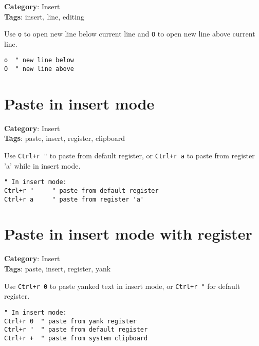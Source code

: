 {{{{{{\textbf{Category}: Insert\\ \textbf{Tags}: insert, line, editing
\vspace{0.5cm}

Use {\footnotesize \Verb§o§} to open new line below current line and {\footnotesize \Verb§O§} to open new line above current line.

\begin{Exa*}{}
\begin{Verbatim}[fontsize=\footnotesize, breaklines, breakanywhere]
o  " new line below
O  " new line above
\end{Verbatim}
\end{Exa*}

\section{Paste in insert mode}

\textbf{Category}: Insert\\ \textbf{Tags}: paste, insert, register, clipboard
\vspace{0.5cm}

Use {\footnotesize \Verb§Ctrl+r "§} to paste from default register, or {\footnotesize \Verb§Ctrl+r a§} to paste from register 'a' while in insert mode.

\begin{Exa*}{}
\begin{Verbatim}[fontsize=\footnotesize, breaklines, breakanywhere]
" In insert mode:
Ctrl+r "     " paste from default register
Ctrl+r a     " paste from register 'a'
\end{Verbatim}
\end{Exa*}

\section{Paste in insert mode with register}

\textbf{Category}: Insert\\ \textbf{Tags}: paste, insert, register, yank
\vspace{0.5cm}

Use {\footnotesize \Verb§Ctrl+r 0§} to paste yanked text in insert mode, or {\footnotesize \Verb§Ctrl+r "§} for default register.

\begin{Exa*}{}
\begin{Verbatim}[fontsize=\footnotesize, breaklines, breakanywhere]
" In insert mode:
Ctrl+r 0  " paste from yank register
Ctrl+r "  " paste from default register
Ctrl+r +  " paste from system clipboard
\end{Verbatim}
\end{Exa*}

}}}}}}
